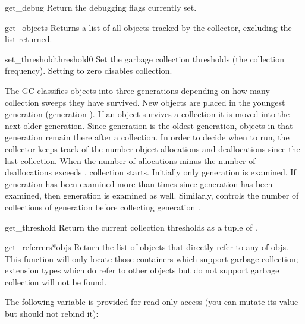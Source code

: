 \begin{funcdesc}{get_debug}{}
Return the debugging flags currently set.
\end{funcdesc}

\begin{funcdesc}{get_objects}{}
Returns a list of all objects tracked by the collector, excluding the
list returned.
\end{funcdesc}

\begin{funcdesc}{set_threshold}{threshold0}
Set the garbage collection thresholds (the collection frequency).
Setting  to zero disables collection.

The GC classifies objects into three generations depending on how many
collection sweeps they have survived.  New objects are placed in the
youngest generation (generation ).  If an object survives a
collection it is moved into the next older generation.  Since
generation  is the oldest generation, objects in that
generation remain there after a collection.  In order to decide when
to run, the collector keeps track of the number object allocations and
deallocations since the last collection.  When the number of
allocations minus the number of deallocations exceeds
, collection starts.  Initially only generation
 is examined.  If generation  has been examined more
than  times since generation  has been
examined, then generation  is examined as well.  Similarly,
 controls the number of collections of generation
 before collecting generation .
\end{funcdesc}

\begin{funcdesc}{get_threshold}{}
Return the current collection thresholds as a tuple of
.
\end{funcdesc}

\begin{funcdesc}{get_referrers}{*objs}
Return the list of objects that directly refer to any of objs. This
function will only locate those containers which support garbage
collection; extension types which do refer to other objects but do not
support garbage collection will not be found.
\end{funcdesc}

The following variable is provided for read-only access (you can
mutate its value but should not rebind it):

